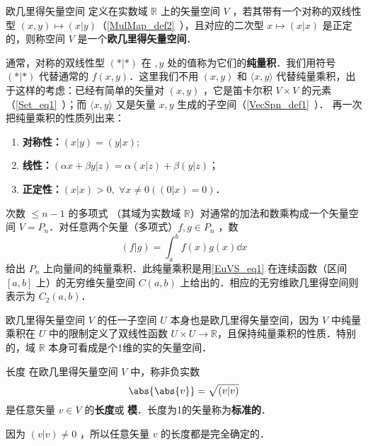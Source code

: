 

\begin{definition}{欧几里得矢量空间}\label{EuVS_def1}
定义在实数域 $\mathbb R$ 上的矢量空间 $V$ ，若其带有一个对称的双线性型 $(x,y)\mapsto(x|y)$（\autoref{MulMap_def2}~），且对应的二次型 $ x\mapsto(x| x)$ 是正定的，则称空间 $V$ 是一个\textbf{欧几里得矢量空间}．
\end{definition}
通常，对称的双线性型 $(*|*)$ 在 $,y$ 处的值称为它们的\textbf{纯量积}．我们用符号 $(*|*)$ 代替通常的 $f(x,y)$．这里我们不用 $(x,y)$ 和 $\langle x,y\rangle$ 代替纯量乘积，出于这样的考虑：已经有简单的矢量对 $(x,y)$ ，它是笛卡尔积 $V\times V$ 的元素（\autoref{Set_eq1}~）；而 $\langle x,y\rangle $ 又是矢量 $x,y$ 生成的子空间（\autoref{VecSpn_def1}~）．
再一次把纯量乘积的性质列出来：
\begin{enumerate}
\item \textbf{对称性：}$(x|y)=(y|x)$;
\item \textbf{线性：}$(\alpha x+\beta y| z)=\alpha( x| z)+\beta( y| z)$；
\item \textbf{正定性：}$( x| x)>0,\;\forall x\neq0(( 0| x)=0)$．
\end{enumerate}
\begin{example}{}\label{EuVS_ex1}
次数 $\leq n-1$ 的多项式 （其域为实数域 $\mathbb R$）对通常的加法和数乘构成一个矢量空间 $V=P_n$．对任意两个矢量（多项式）$f,g\in P_n$ ，数 
\begin{equation}\label{EuVS_eq1}
(f|g)=\int_a^b f(x)g(x)\dd x
\end{equation}
给出 $P_n$ 上向量间的纯量乘积．此纯量乘积是用\autoref{EuVS_eq1} 在连续函数（区间 $[a,b]$ 上）的无穷维矢量空间 $C(a,b)$ 上给出的．相应的无穷维欧几里得空间则表示为 $C_2(a,b)$．
\end{example}
\begin{example}{}
欧几里得矢量空间 $V$ 的任一子空间 $U$ 本身也是欧几里得矢量空间，因为 $V$ 中纯量乘积在 $U$ 中的限制定义了双线性函数 $U\times U\rightarrow\mathbb R$，且保持纯量乘积的性质．特别的，域 $\mathbb R$ 本身可看成是个1维的实的矢量空间．
\end{example}
\begin{definition}{长度}\label{EuVS_def2}
在欧几里得矢量空间 $V$ 中，称非负实数
\begin{equation}
\abs{\abs{ v}}=\sqrt{( v| v)}
\end{equation}
是任意矢量 $v\in V$ 的\textbf{长度}或 \textbf{模}．长度为1的矢量称为\textbf{标准的}．
\end{definition}
因为 $(v|v)\neq0$ ，所以任意矢量 $v$ 的长度都是完全确定的．

